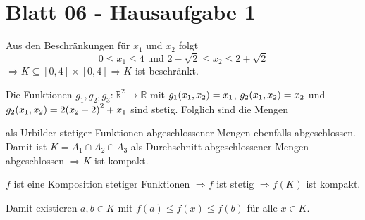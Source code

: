 \documentclass{scrreprt}
\begin{document}
\section{Blatt 06 - Hausaufgabe 1}

Aus den Beschränkungen für $x_1$ und $x_2$ folgt
\[
  0 \leq x_1 \leq 4 \text{ und } 2 - \sqrt{2} \leq x_2 \leq 2 + \sqrt{2}
\]
$\Rightarrow K \subseteq [0, 4] \times [0, 4] \Rightarrow K$ ist beschränkt.

\begin{center}
\end{center}

Die Funktionen $g_1, g_2, g_3 \colon \mathbb{R}^2 \to \mathbb{R}$ mit
$g_1\qty(x_1, x_2) = x_1$, $g_2\qty(x_1, x_2) = x_2$ und
$g_2\qty(x_1, x_2) = 2\qty(x_2 - 2)^2 + x_1$ sind stetig.
Folglich sind die Mengen
\begin{flalign*}
  A_1 &\coloneqq g_1^{-1}([0, \infty)) = [0, \infty) \times {} & \\
  A_2 &\coloneqq g_2^{-1}([0, \infty)) =  ) =
  \qty{\qty(x_1, x_2) \in \mathbb{R}^2 \middle| \qty(x_1 \in \mathbb{R}) \land \qty(x_1 \leq 2\qty(2 - \qty(x_2 - 2)^2))}
\end{flalign*}
als Urbilder stetiger Funktionen abgeschlossener Mengen ebenfalls abgeschlossen.
Damit ist $K = A_1 \cap A_2 \cap A_3$ als Durchschnitt abgeschlossener Mengen
abgeschlossen $\Rightarrow K$ ist kompakt.

$f$ ist eine Komposition stetiger Funktionen
$\Rightarrow f$ ist stetig
$\Rightarrow f(K)$ ist kompakt.

Damit existieren $a, b \in K$ mit $f(a) \leq f(x) \leq f(b)$ für alle
$x \in K$.
\end{document}
